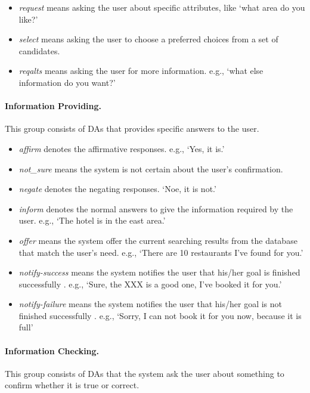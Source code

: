 \documentclass[letterpaper]{article} \usepackage{aaai22}  \usepackage{times}  \usepackage{helvet}  \usepackage{courier}  \usepackage[hyphens]{url}  \usepackage{graphicx} \urlstyle{rm} \def\UrlFont{\rm}  \usepackage{natbib}  \usepackage{caption} \DeclareCaptionStyle{ruled}{labelfont=normalfont,labelsep=colon,strut=off} \frenchspacing  \setlength{\pdfpagewidth}{8.5in}  \setlength{\pdfpageheight}{11in}  \usepackage{algorithm}
\begin{document}
\begin{itemize}
    \item \textit{request} means asking the user about specific attributes, like `what area do you like?'
    \item \textit{select} means asking the user to choose a preferred choices from a set of candidates.
     \item \textit{reqalts} means asking the user for more information. e.g., `what else information do you want?'
\end{itemize}

\paragraph{Information Providing.}  This group consists of DAs that provides specific answers to the user.

\begin{itemize}
    \item \textit{affirm} denotes the affirmative responses. e.g., `Yes, it is.'
    \item \textit{not\_sure} means the system is not certain about the user's confirmation. 
     \item \textit{negate} denotes the negating responses. `Noe, it is not.'
     \item \textit{inform} denotes the normal answers to give the information required by the user. e.g.,  `The hotel is in the east area.'
     \item \textit{offer} means the system offer the current searching results from the database that match the user's need.  e.g., `There are 10 restaurants I've found for you.' 
     \item \textit{notify-success} means the system notifies the user that his/her goal is finished successfully . e.g., `Sure, the XXX  is a good one, I've booked it for you.' 
     \item \textit{notify-failure} means the system notifies the user that his/her goal is not finished successfully . e.g., `Sorry, I can not book it for you now, because it is full' 
\end{itemize}


\paragraph{Information Checking.}  This group consists of DAs that the system ask the user about something to confirm whether it is true or correct.
\end{document}

